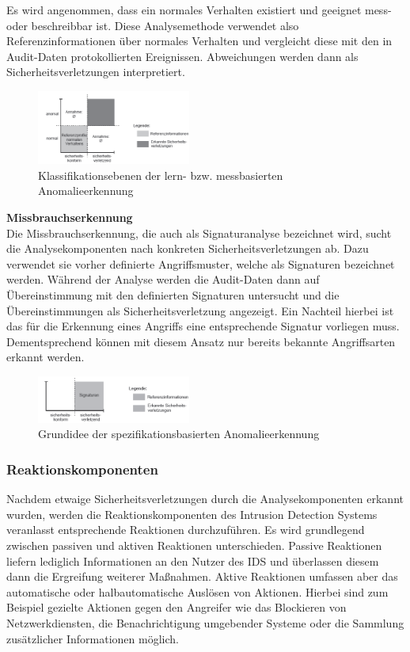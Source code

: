 \documentclass[11pt]{scrartcl}
\begin{document}
Es wird angenommen, dass ein normales Verhalten existiert und geeignet mess- oder beschreibbar ist. Diese Analysemethode verwendet also Referenzinformationen über normales Verhalten und
vergleicht diese mit den in Audit-Daten protokollierten Ereignissen. Abweichungen
werden dann als Sicherheitsverletzungen interpretiert.\\

\begin{figure}
\includegraphics[width=0.45\textwidth]{aa4.png}
	\caption{Klassifikationsebenen der lern- bzw. messbasierten Anomalieerkennung \cite{5}}
	\label{fig3}
\end{figure} \noindent
\textbf{Missbrauchserkennung}\\
Die Missbrauchserkennung, die auch als Signaturanalyse
bezeichnet wird, sucht die Analysekomponenten nach konkreten Sicherheitsverletzungen ab. Dazu verwendet sie vorher definierte Angriffsmuster, welche als Signaturen bezeichnet werden. Während der Analyse werden die Audit-Daten dann auf Übereinstimmung mit den definierten
Signaturen untersucht und die Übereinstimmungen als Sicherheitsverletzung
angezeigt. Ein Nachteil hierbei ist das für die Erkennung eines Angriffs eine entsprechende Signatur vorliegen muss. Dementsprechend können mit diesem Ansatz nur bereits bekannte Angriffsarten erkannt werden.\\
\begin{figure}
\includegraphics[width=0.45\textwidth]{aa5.png}
	\caption{Grundidee der spezifikationsbasierten Anomalieerkennung \cite{5}}
	\label{fig4}
\end{figure} \noindent
\subsubsection{Reaktionskomponenten}
\label{sec:reaction}
Nachdem etwaige Sicherheitsverletzungen durch die Analysekomponenten erkannt
wurden, werden die Reaktionskomponenten des Intrusion Detection Systems veranlasst entsprechende
Reaktionen durchzuführen. Es wird grundlegend zwischen passiven
und aktiven Reaktionen unterschieden. Passive Reaktionen liefern lediglich Informationen
an den Nutzer des IDS und überlassen diesem dann die Ergreifung
weiterer Maßnahmen. Aktive Reaktionen umfassen aber das automatische oder
halbautomatische Auslösen von Aktionen. Hierbei sind zum Beispiel gezielte Aktionen gegen den Angreifer wie das Blockieren von Netzwerkdiensten, die Benachrichtigung umgebender Systeme oder die Sammlung zusätzlicher Informationen möglich. \cite{5}
\end{document}
